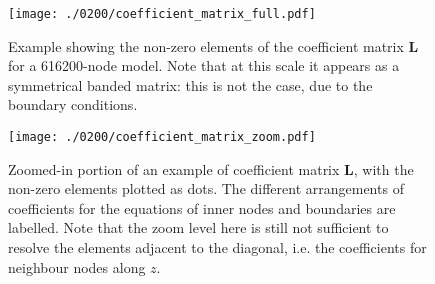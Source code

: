 \begin{figure}[hb]
    \begin{adjustbox}{center}
        \texttt{[image: ./0200/coefficient\_matrix\_full.pdf]}
    \end{adjustbox}
    \caption[Example showing the non-zero elements of the coefficient matrix]{Example showing the non-zero elements of the coefficient matrix $\bm{L}$ for a \num{616200}-node model. Note that at this scale it appears as a symmetrical banded matrix: this is not the case, due to the boundary conditions.}
    \label{suppl:fig:L_coefficients_full}
\end{figure}

\begin{figure}
    \begin{adjustbox}{center}
        \texttt{[image: ./0200/coefficient\_matrix\_zoom.pdf]}
    \end{adjustbox}
    \caption[Zoomed-in portion of an example of coefficient matrix, labelled.]{Zoomed-in portion of an example of coefficient matrix $\bm{L}$, with the non-zero elements plotted as dots. The different arrangements of coefficients for the equations of inner nodes and boundaries are labelled. Note that the zoom level here is still not sufficient to resolve the elements adjacent to the diagonal, i.e. the coefficients for neighbour nodes along $z$.}
    \label{suppl:fig:L_coefficients_zoom}
\end{figure}



